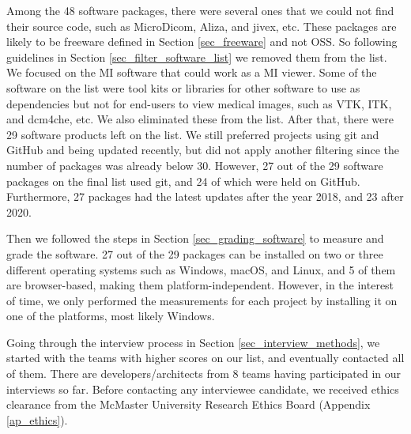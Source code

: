 Among the 48 software packages, there were several ones that we could not find their source code, such as MicroDicom, Aliza, and jivex, etc. These packages are likely to be freeware defined in Section \ref{sec_freeware} and not OSS. So following guidelines in Section \ref{sec_filter_software_list} we removed them from the list. We focused on the MI software that could work as a MI viewer. Some of the software on the list were tool kits or libraries for other software to use as dependencies but not for end-users to view medical images, such as VTK, ITK, and dcm4che, etc. We also eliminated these from the list. After that, there were 29 software products left on the list. We still preferred projects using git and GitHub and being updated recently, but did not apply another filtering since the number of packages was already below 30. However, 27 out of the 29 software packages on the final list used git, and 24 of which were held on GitHub. Furthermore, 27 packages had the latest updates after the year 2018, and 23 after 2020.

Then we followed the steps in Section \ref{sec_grading_software} to measure and grade the software. 27 out of the 29 packages can be installed on two or three different operating systems such as Windows, macOS, and Linux, and 5 of them are browser-based, making them platform-independent. However, in the interest of time, we only performed the measurements for each project by installing it on one of the platforms, most likely Windows.

Going through the interview process in Section \ref{sec_interview_methods}, we started with the teams with higher scores on our list, and eventually contacted all of them. There are developers/architects from 8 teams having participated in our interviews so far. Before contacting any interviewee candidate, we received ethics clearance from the McMaster University Research Ethics Board (Appendix \ref{ap_ethics}).
